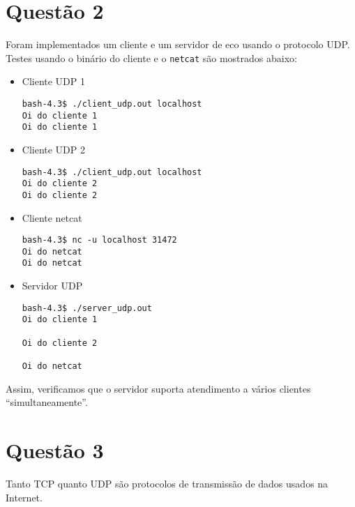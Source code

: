 \documentclass[a4paper,10pt]{article}
\begin{document}
\section{Questão 2}

Foram implementados um cliente e um servidor de eco usando o protocolo UDP. Testes usando o binário do cliente e o {\tt netcat} são mostrados abaixo:

\begin{itemize}
\item Cliente UDP 1

\begin{lstlisting}
bash-4.3$ ./client_udp.out localhost
Oi do cliente 1
Oi do cliente 1

\end{lstlisting}

\item Cliente UDP 2

\begin{lstlisting}
bash-4.3$ ./client_udp.out localhost
Oi do cliente 2
Oi do cliente 2

\end{lstlisting}

\item Cliente netcat

\begin{lstlisting}
bash-4.3$ nc -u localhost 31472
Oi do netcat   
Oi do netcat

\end{lstlisting}


\item Servidor UDP

\begin{lstlisting}
bash-4.3$ ./server_udp.out
Oi do cliente 1

Oi do cliente 2

Oi do netcat   

\end{lstlisting}
\end{itemize}

Assim, verificamos que o servidor suporta atendimento a vários clientes ``simultaneamente''.

\section{Questão 3}

Tanto TCP quanto UDP são protocolos de transmissão de dados usados na Internet. 
\end{document}
